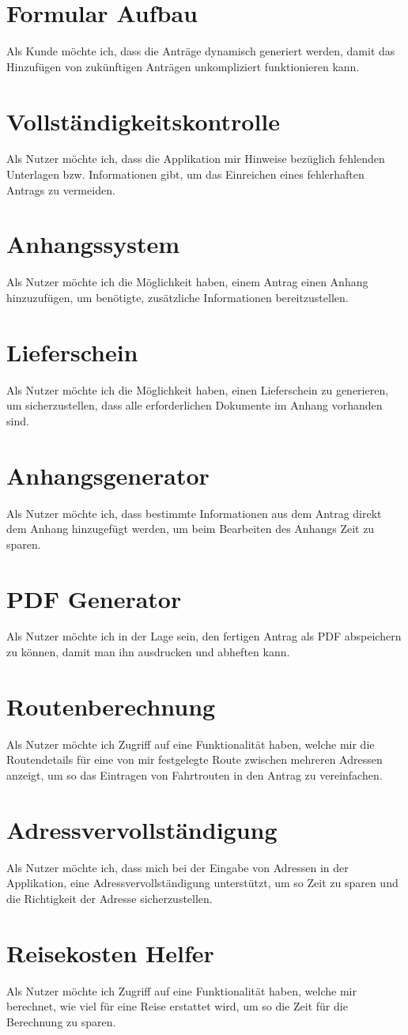 \section{Formular Aufbau}
Als Kunde möchte ich, dass die Anträge dynamisch generiert werden, damit das Hinzufügen von zukünftigen
Anträgen unkompliziert funktionieren kann.
\section{Vollständigkeitskontrolle}
Als Nutzer möchte ich, dass die Applikation mir Hinweise bezüglich fehlenden Unterlagen bzw. 
Informationen gibt, um das Einreichen eines fehlerhaften Antrags zu vermeiden.
\section{Anhangssystem}
Als Nutzer möchte ich die Möglichkeit haben, einem Antrag einen Anhang hinzuzufügen, um benötigte, 
zusätzliche Informationen bereitzustellen.
\section{Lieferschein}
Als Nutzer möchte ich die Möglichkeit haben, einen Lieferschein zu generieren, um sicherzustellen, 
dass alle erforderlichen Dokumente im Anhang vorhanden sind.
\section{Anhangsgenerator}
Als Nutzer möchte ich, dass bestimmte Informationen aus dem Antrag direkt dem Anhang hinzugefügt 
werden, um beim Bearbeiten des Anhangs Zeit zu sparen.
\section{\ac{PDF} Generator}
Als Nutzer möchte ich in der Lage sein, den fertigen Antrag als \ac{PDF} abspeichern zu können, damit man ihn ausdrucken und abheften kann.
\section{Routenberechnung}
Als Nutzer möchte ich Zugriff auf eine Funktionalität haben, welche mir die Routendetails für eine von mir festgelegte
Route zwischen mehreren Adressen anzeigt, um so das Eintragen von Fahrtrouten in den Antrag zu vereinfachen.
\section{Adressvervollständigung}
Als Nutzer möchte ich, dass mich bei der Eingabe von Adressen in der Applikation, eine 
Adressvervollständigung unterstützt, um so Zeit zu sparen und die Richtigkeit der 
Adresse sicherzustellen.
\section{Reisekosten Helfer}
Als Nutzer möchte ich Zugriff auf eine Funktionalität haben, welche mir berechnet, wie viel für eine 
Reise erstattet wird, um so die Zeit für die Berechnung zu sparen.